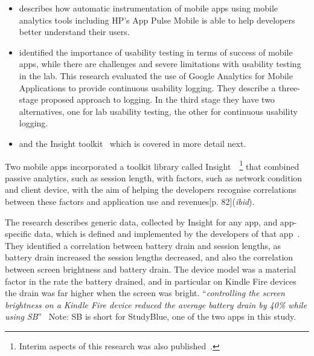 \begin{itemize}
    \item \citet{parate2016_RECKON_an_analytics_framework_for_app_developers_HP_AppPulseMobile} describes how automatic instrumentation of mobile apps using mobile analytics tools including HP's App Pulse Mobile is able to help developers better understand their users.
    \item \citet{ferre2017_extending_mobile_app_analytics_for_usability_test_logging} identified the importance of usability testing in terms of success of mobile apps, while there are challenges and severe limitations with usability testing in the lab. This research evaluated the use of Google Analytics for Mobile Applications to provide continuous usability logging. They describe a three-stage proposed approach to logging. In the third stage they have two alternatives, one for lab usability testing, the other for continuous usability logging.
    \item and the Insight toolkit~\citet{patro2013_capturing_mobile_experience_in_the_wild} which is covered in more detail next.
\end{itemize}   

Two mobile apps incorporated a toolkit library called Insight~\citep[p. 82]{patro2015_building_blocks_to_understand_wireless_experience}~\footnote{Interim aspects of this research was also published~\citet{patro2013_capturing_mobile_experience_in_the_wild}.} that combined passive analytics, such as session length, with factors, such as network condition and client device, with the aim of helping the developers recognise correlations between these factors and application use and revenues[p. 82](\textit{ibid}).

The research describes generic data, collected by Insight for any app, and app-specific data, which is defined and implemented by the developers of that app~\citep[pp. 87-88]{patro2015_building_blocks_to_understand_wireless_experience}. They identified a correlation between battery drain and session lengths, as battery drain increased the session lengths decreased, and also the correlation between screen brightness and battery drain. The device model was a material factor in the rate the battery drained, and in particular on Kindle Fire devices the drain was far higher when the screen was bright. ``\emph{controlling the screen brightness on a Kindle Fire device reduced the average battery drain by 40\% while using SB}''~\citep[p. 13]{patro2015_building_blocks_to_understand_wireless_experience} Note: SB is short for StudyBlue, one of the two apps in this study.

